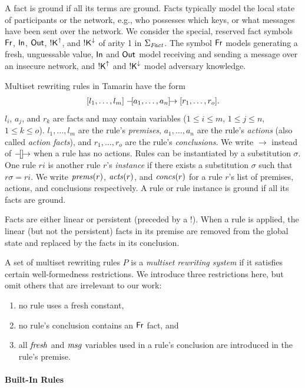 A fact is ground if all its terms are ground.
Facts typically model the local state of participants or the network, e.g., who possesses which keys, or what messages have been sent over the network.
We consider the special, reserved fact symbols $\mathsf{Fr}$, $\mathsf{In}$, $\mathsf{Out}$, $\mathsf{!K}^{\uparrow}$, and $\mathsf{!K}^{\downarrow}$ of arity 1 in $\Sigma_\mathit{Fact}$.
The symbol $\mathsf{Fr}$ models generating a fresh, unguessable value, $\mathsf{In}$ and $\mathsf{Out}$ model receiving and sending a message over an insecure network, and $\mathsf{!K}^{\uparrow}$ and $\mathsf{!K}^{\downarrow}$ model adversary knowledge.

Multiset rewriting rules in Tamarin have the form $$[l_1, \dots, l_m] \mathrel{-\mkern-4mu[a_1, \dots, a_n]\mkern-8mu\to} [r_1, \dots, r_o].$$
$l_i$, $a_j$, and $r_k$ are facts and may contain variables ($1 \leq i \leq m$, $1 \leq j \leq n$, $1 \leq k \leq o$).
$l_1, \dots, l_m$ are the rule's \emph{premises}, $a_1, \dots, a_n$ are the rule's \emph{actions} (also called \emph{action facts}), and $r_1, \dots, r_o$ are the rule's \emph{conclusions}.
We write $\rightarrow$ instead of $\mathrel{-\mkern-4mu[]\mkern-8mu\to}$ when a rule has no actions.
Rules can be instantiated by a substitution $\sigma$.
One rule $ri$ is another rule $r$'s \emph{instance} if there exists a substitution $\sigma$ such that $r\sigma = ri$.
We write $\mathit{prems}(r)$, $\mathit{acts}(r)$, and $\mathit{concs}(r)$ for a rule $r$'s list of premises, actions, and conclusions respectively.
A rule or rule instance is ground if all its facts are ground.

Facts are either linear or persistent (preceded by a $!$).
When a rule is applied, the linear (but not the persistent) facts in its premise are removed from the global state and replaced by the facts in its conclusion.

A set of multiset rewriting rules $P$ is a \emph{multiset rewriting system} if it satisfies certain well-formedness restrictions.
We introduce three restrictions here, but omit others that are irrelevant to our work:
\begin{enumerate}[label=(\roman*)]
  \item no rule uses a fresh constant,
  \item no rule's conclusion contains an $\mathsf{Fr}$ fact, and
  \item all $\mathit{fresh}$ and $\mathit{msg}$ variables used in a rule's conclusion are introduced in the rule's premise.
\end{enumerate}

\paragraph{Built-In Rules}

